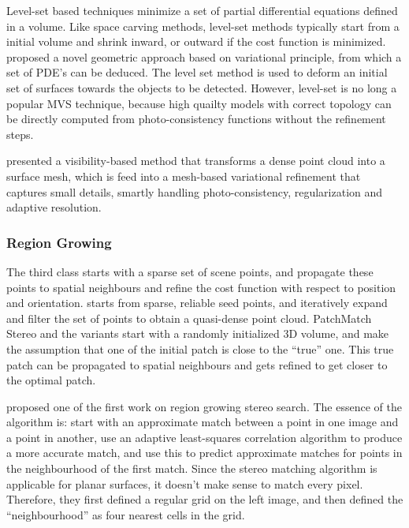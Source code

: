 Level-set based techniques minimize a set of partial differential equations defined in a volume. Like space carving methods, level-set methods typically start from a initial volume and shrink inward, or outward if the cost function is minimized. \citeauthor{faugeras2002variational} proposed a novel geometric approach based on variational principle, from which a set of PDE's can be deduced. The level set method is used to deform an initial set of surfaces towards the objects to be detected. However, level-set is no long a popular MVS technique, because high quailty models with correct topology can be directly computed from photo-consistency functions without the refinement steps.

\citeauthor{hiep2009towards} presented a visibility-based method that transforms a dense point cloud into a surface mesh, which is feed into a mesh-based variational refinement that captures small details, smartly handling photo-consistency, regularization and adaptive resolution.


\subsubsection{Region Growing}
The third class starts with a sparse set of scene points, and propagate these points to spatial neighbours and refine the cost function with respect to position and orientation. \citeauthor{furukawa2010accurate} starts from sparse, reliable seed points, and iteratively expand and filter the set of points to obtain a quasi-dense point cloud. PatchMatch Stereo and the variants start with a randomly initialized 3D volume, and make the assumption that one of the initial patch is close to the ``true'' one. This true patch can be propagated to spatial neighbours and gets refined to get closer to the optimal patch.

\citeauthor{otto1989region} proposed one of the first work on region growing stereo search. The essence of the algorithm is: start with an approximate match between a point in one image and a point in another, use an adaptive least-squares correlation algorithm to produce a more accurate match, and use this to predict approximate matches for points in the neighbourhood of the first match. Since the stereo matching algorithm is applicable for planar surfaces, it doesn't make sense to match every pixel. Therefore, they first defined a regular grid on the left image, and then defined the ``neighbourhood'' as four nearest cells in the grid.

